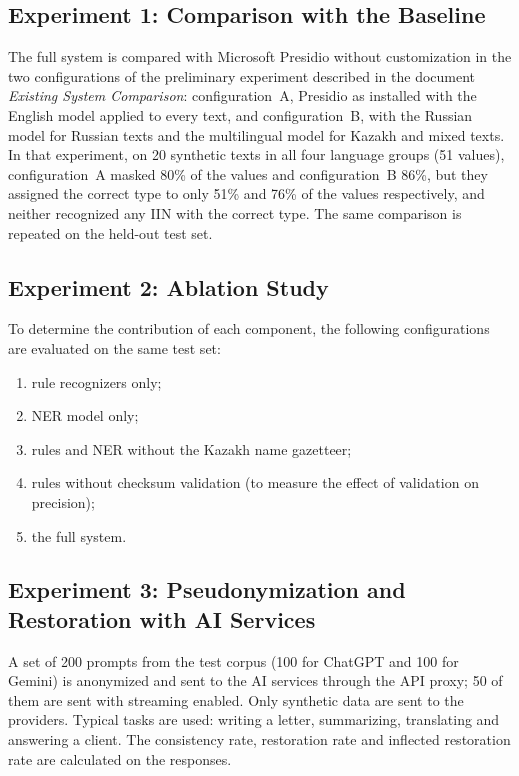 \documentclass[12pt,a4paper]{article}
\begin{document}
\subsection{Experiment 1: Comparison with the Baseline}

The full system is compared with Microsoft Presidio without customization in the two configurations of the preliminary experiment described in the document \emph{Existing System Comparison}: configuration~A, Presidio as installed with the English model applied to every text, and configuration~B, with the Russian model for Russian texts and the multilingual model for Kazakh and mixed texts. In that experiment, on 20 synthetic texts in all four language groups (51 values), configuration~A masked 80\% of the values and configuration~B 86\%, but they assigned the correct type to only 51\% and 76\% of the values respectively, and neither recognized any IIN with the correct type. The same comparison is repeated on the held-out test set.

\subsection{Experiment 2: Ablation Study}

To determine the contribution of each component, the following configurations are evaluated on the same test set:
\begin{enumerate}[label=C\arabic*.,leftmargin=3em]
\item rule recognizers only;
\item NER model only;
\item rules and NER without the Kazakh name gazetteer;
\item rules without checksum validation (to measure the effect of validation on precision);
\item the full system.
\end{enumerate}

\subsection{Experiment 3: Pseudonymization and Restoration with AI Services}

A set of 200 prompts from the test corpus (100 for ChatGPT and 100 for Gemini) is anonymized and sent to the AI services through the API proxy; 50 of them are sent with streaming enabled. Only synthetic data are sent to the providers. Typical tasks are used: writing a letter, summarizing, translating and answering a client. The consistency rate, restoration rate and inflected restoration rate are calculated on the responses.
\end{document}
